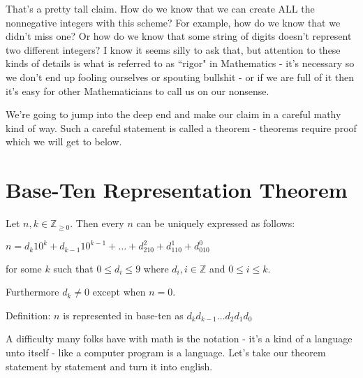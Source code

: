 \documentclass{article}
\newenvironment{jprIn}{\begin{adjustwidth}{2em}{}}{\end{adjustwidth}}
\begin{document}
That's a pretty tall claim.
How do we know that we can create ALL the nonnegative
integers with this scheme? For example,
how do we know that we didn't miss one? Or how do we know that some string of
digits doesn't represent two different integers? I know it seems silly to ask that,
but attention to these kinds of details is what is referred to as ``rigor"
in Mathematics - it's necessary so we don't end up fooling ourselves or spouting
bullshit - or if we are full of it then it's easy
for other Mathematicians to call us on our nonsense.

We're going to jump into the deep end and make our claim in a careful mathy kind of way.
Such a careful statement is called a theorem - theorems require proof which we will get to below.

\section*{Base-Ten Representation Theorem}

\begin{jprIn}
Let $n,k\in \mathbb{Z}_{\ge 0}$. Then every $n$ can be uniquely expressed as follows:

\hspace{3em}$n=d_k10^k+d_{k-1}10^{k-1}+\dots+d_210^2+d_110^1+d_010^0$

for some $k$ such that $0 \le d_i \le 9$ where $d_i,i\in\mathbb{Z}$ and $0 \le i \le k$.

Furthermore $d_k\ne0$ except when $n=0$.

Definition: $n$ is represented in base-ten as $d_kd_{k-1}\dots{}d_2d_1d_0$
\end{jprIn}
\bigskip

A difficulty many folks have with math is the notation - it's
a kind of a language unto itself - like a computer program is a language.
Let's take our theorem statement by statement and turn it into english.
\end{document}
